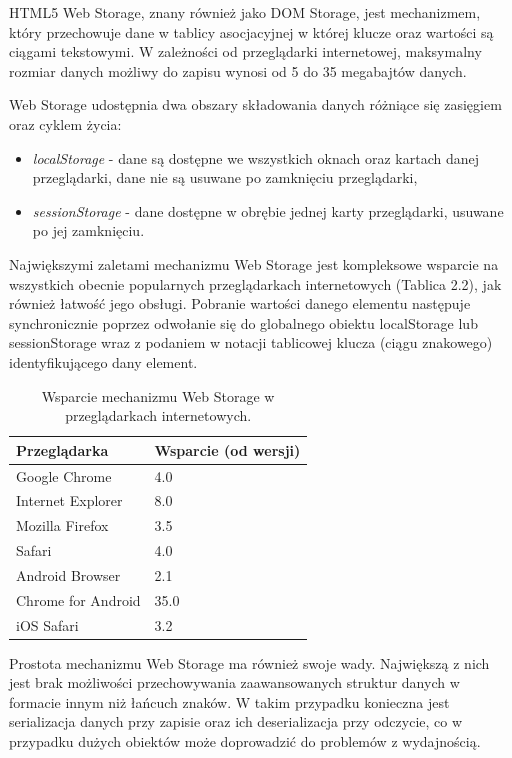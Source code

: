 HTML5 Web Storage\cite{webStorage}, znany również jako DOM Storage, jest mechanizmem, który przechowuje dane w tablicy asocjacyjnej w której klucze oraz wartości są ciągami tekstowymi. W zależności od przeglądarki internetowej, maksymalny rozmiar danych możliwy do zapisu wynosi od 5 do 35 megabajtów danych.

Web Storage udostępnia dwa obszary składowania danych różniące się zasięgiem oraz cyklem życia:

\begin{itemize}
\item \emph{localStorage} - dane są dostępne we wszystkich oknach oraz kartach danej przeglądarki, dane nie są usuwane po zamknięciu przeglądarki,
\item \emph{sessionStorage} - dane dostępne w obrębie jednej karty przeglądarki, usuwane po jej zamknięciu.
\end{itemize}

Największymi zaletami mechanizmu Web Storage jest kompleksowe wsparcie na wszystkich obecnie popularnych przeglądarkach internetowych (Tablica 2.2), jak również łatwość jego obsługi. Pobranie wartości danego elementu następuje synchronicznie poprzez odwołanie się do globalnego obiektu localStorage lub sessionStorage wraz z podaniem w notacji tablicowej klucza (ciągu znakowego) identyfikującego dany element.

\begin{table}[h]
\centering
    \begin{tabular}{ | p{8cm} | p{6cm} | }
    \hline
    \textbf{Przeglądarka} & \textbf{Wsparcie (od wersji)} \\ \hline
	Google Chrome & 4.0
	\\ \hline
	Internet Explorer & 8.0
	\\ \hline
	Mozilla Firefox & 3.5
	\\ \hline
	Safari & 4.0
	\\ \hline
	Android Browser & 2.1
	\\ \hline
	Chrome for Android & 35.0
	\\ \hline
	iOS Safari & 3.2
	\\ \hline
    \end{tabular}
	\caption{Wsparcie mechanizmu Web Storage w przeglądarkach internetowych.}
\end{table}

Prostota mechanizmu Web Storage ma również swoje wady. Największą z nich jest brak możliwości przechowywania zaawansowanych struktur danych w formacie innym niż łańcuch znaków. W takim przypadku konieczna jest serializacja danych przy zapisie oraz ich deserializacja przy odczycie, co w przypadku dużych obiektów może doprowadzić do problemów z wydajnością.

